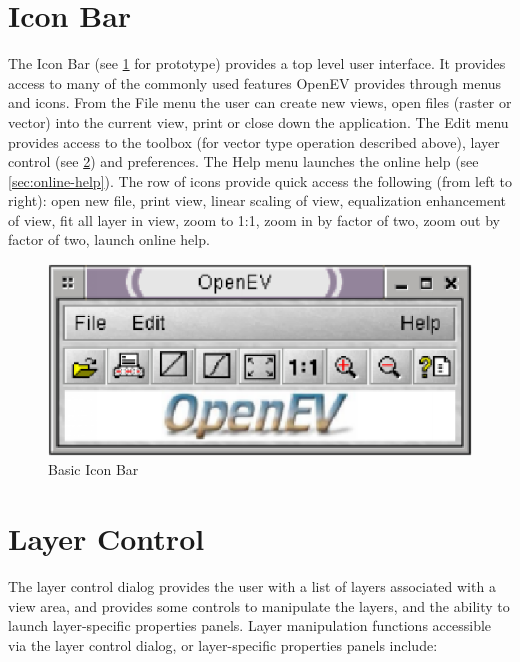 \documentclass{openevreport}
\begin{document}
\section{Icon Bar}
The Icon Bar (see \ref{fig:iconbar} for prototype) provides a top level 
user interface.  It provides access to many of the commonly used features
OpenEV provides through menus and icons.  From the File menu the user can
create new views, open files (raster or vector) into the current view, print
or close down the application.  The Edit menu provides access to the toolbox
(for vector type operation described above), layer control (see \ref{sec:layer-control}) and
preferences.  The Help menu launches the online help (see \ref{sec:online-help}).  The row
of icons provide quick access the following (from left
to right):  open new file, print view, linear scaling of view, equalization
enhancement of view, fit all layer in view, zoom to 1:1, zoom in by factor of two,
zoom out by factor of two, launch online help. 

\begin{figure}
\centering
\includegraphics{toolbar.eps}
\caption{Basic Icon Bar}
\label{fig:iconbar}
\end{figure}

\section{Layer Control}
\label{sec:layer-control}

The layer control dialog provides the user with a list of layers
associated with a view area, and provides some controls to manipulate
the layers, and the ability to launch layer-specific properties panels.  
Layer manipulation functions accessible via the layer control dialog, or
layer-specific properties panels include:
\end{document}
